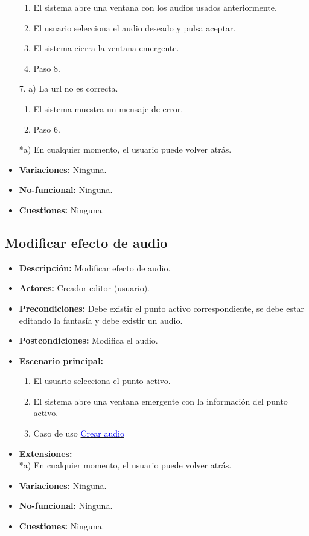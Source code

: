 \documentclass[12pt,letterpaper]{article}
\begin{document}
\begin{itemize}
	\begin{enumerate}
		\item El sistema abre una ventana con los audios usados anteriormente.
		\item El usuario selecciona el audio deseado y pulsa aceptar.
		\item El sistema cierra la ventana emergente.
		\item Paso 8.
	\end{enumerate}
	7. a) La url no es correcta.
	\begin{enumerate}
		\item El sistema muestra un mensaje de error.
		\item Paso 6.
	\end{enumerate}
	*a) En cualquier momento, el usuario puede volver atrás.
	\item \textbf{Variaciones:} Ninguna.
	\item \textbf{No-funcional:} Ninguna.
	\item \textbf{Cuestiones:} Ninguna.
\end{itemize}

\subsection{Modificar efecto de audio}
\begin{itemize}
	\item \textbf{Descripción:} Modificar efecto de audio.
	\item \textbf{Actores:} Creador-editor (usuario).
	\item \textbf{Precondiciones:} Debe existir el punto activo correspondiente, se debe estar editando la fantasía y debe existir un audio.
	\item \textbf{Postcondiciones:} Modifica el audio.
	\item \textbf{Escenario principal:}
	\begin{enumerate}
		\item El usuario selecciona el punto activo.
		\item El sistema abre una ventana emergente con la información del punto activo.
		\item Caso de uso \hyperlink{crearaudio}{\textcolor{blue}{Crear audio}}
	\end{enumerate}
	\item \textbf{Extensiones:} \\ *a) En cualquier momento, el usuario puede volver atrás.
	\item \textbf{Variaciones:} Ninguna.
	\item \textbf{No-funcional:} Ninguna.
	\item \textbf{Cuestiones:} Ninguna.
\end{itemize}
\end{document}
